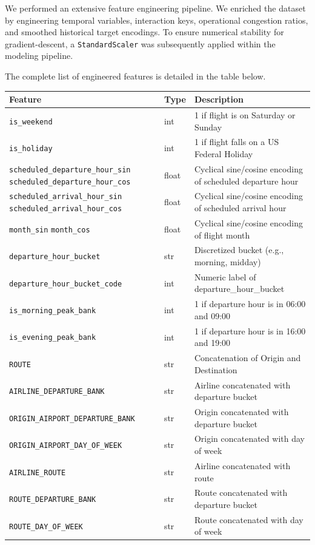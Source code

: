 \documentclass{article}
\newcommand{\code}[1]{\texttt{\small #1}}
\begin{document}
We performed an extensive feature engineering pipeline. We enriched the dataset by engineering temporal variables, interaction keys, operational congestion ratios, and smoothed historical target encodings. To ensure numerical stability for gradient-descent, a \code{StandardScaler} was subsequently applied within the modeling pipeline.

The complete list of engineered features is detailed in the table below.

\begin{tcolorbox}[mainbox, title={Engineered Features}]
\renewcommand{\arraystretch}{1.3}
\begin{longtable}{L{6cm} L{1.5cm} p{6cm}}
    \toprule
    \textbf{Feature} & \textbf{Type} & \textbf{Description} \\
    \midrule
    \endhead
    \code{is\_weekend} & int & 1 if flight is on Saturday or Sunday \\
    \code{is\_holiday} & int & 1 if flight falls on a US Federal Holiday \\
    \code{scheduled\_departure\_hour\_sin} \newline \code{scheduled\_departure\_hour\_cos} & float & Cyclical sine/cosine encoding of scheduled departure hour \\
    \code{scheduled\_arrival\_hour\_sin} \newline \code{scheduled\_arrival\_hour\_cos} & float & Cyclical sine/cosine encoding of scheduled arrival hour \\
    \code{month\_sin} \newline \code{month\_cos} & float & Cyclical sine/cosine encoding of flight month \\
    \code{departure\_hour\_bucket} & str & Discretized bucket (e.g., morning, midday) \\
    \code{departure\_hour\_bucket\_code} & int & Numeric label of departure\_hour\_bucket \\
    \code{is\_morning\_peak\_bank} & int & 1 if departure hour is in 06:00 and 09:00 \\
    \code{is\_evening\_peak\_bank} & int & 1 if departure hour is in 16:00 and 19:00 \\
    
    \code{ROUTE} & str & Concatenation of Origin and Destination \\
    \code{AIRLINE\_DEPARTURE\_BANK} & str & Airline concatenated with departure bucket \\
    \code{ORIGIN\_AIRPORT\_DEPARTURE\_BANK} & str & Origin concatenated with departure bucket \\
    \code{ORIGIN\_AIRPORT\_DAY\_OF\_WEEK} & str & Origin concatenated with day of week \\
    \code{AIRLINE\_ROUTE} & str & Airline concatenated with route \\
    \code{ROUTE\_DEPARTURE\_BANK} & str & Route concatenated with departure bucket \\
    \code{ROUTE\_DAY\_OF\_WEEK} & str & Route concatenated with day of week \\


\end{longtable}
\end{tcolorbox}
\end{document}

